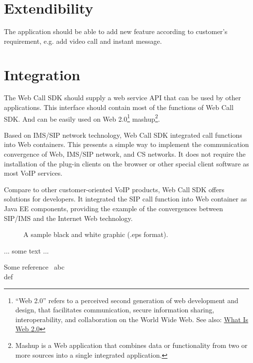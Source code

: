 \section{Extendibility}
\label{sec:Requirement:Extendibility}
The application should be able to add new feature according to customer's requirement, e.g. add video call and instant message.

\section{Integration}
\label{sec:Requirement:Integration}

The Web Call SDK should supply a web service API that can be used by other applications. This interface should contain most of the functions of Web Call SDK. And can be easily used on Web 2.0\footnote{``Web 2.0'' refers to a perceived second generation of web development and design, that facilitates communication, secure information sharing, interoperability, and collaboration on the World Wide Web.\cite{Web2dot0} See also: \href{http://www.oreillynet.com/pub/a/oreilly/tim/news/2005/09/30/what-is-web-20.html}{What Is Web 2.0}\cite{WhatIsWeb2dot0}} mashup\footnote{Mashup is a Web application that combines data or functionality from two or more sources into a single integrated application.}.






Based on IMS/SIP network technology, Web Call SDK integrated call functions into Web containers. This presents a simple way to implement the communication convergence of Web, IMS/SIP network, and CS networks. It does not require the installation of the plug-in clients on the browser or other special client software as most VoIP services.

Compare to other customer-oriented VoIP products, Web Call SDK offers solutions for developers. It integrated the SIP call function into Web container as Java EE components, providing the example of the convergences between SIP/IMS and the Internet Web technology.

\begin{figure}
\centering
{}
\caption{A sample black and white graphic (.eps format).}
\end{figure}

... some text ...

Some reference~
abc\cite{RFC3261}\\
def\cite{RFC3725}


